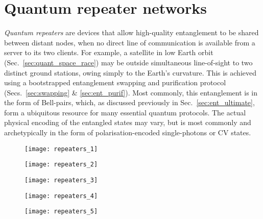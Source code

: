 %
%

\section{Quantum repeater networks} \label{sec:rep_net} 

\textit{Quantum repeaters} are devices that allow high-quality entanglement to be shared between distant nodes, when no direct line of communication is available from a server to its two clients. For example, a satellite in low Earth orbit (Sec.~\ref{sec:quant_space_race}) may be outside simultaneous line-of-sight to two distinct ground stations, owing simply to the Earth's curvature. This is achieved using a bootstrapped entanglement swapping and purification protocol (Secs.~\ref{sec:swapping} \& \ref{sec:ent_purif}). Most commonly, this entanglement is in the form of Bell-pairs, which, as discussed previously in Sec.~\ref{sec:ent_ultimate}, form a ubiquitous resource for many essential quantum protocols. The actual physical encoding of the entangled states may vary, but is most commonly and archetypically in the form of polarisation-encoded single-photons or CV states.




\begin{figure}[!htb]
\texttt{[image: repeaters\_1]}
\caption{} \label{fig:repeaters_1}	
\end{figure}

\begin{figure}[!htb]
\texttt{[image: repeaters\_2]}
\caption{} \label{fig:repeaters_2}	
\end{figure}

\begin{figure}[!htb]
\texttt{[image: repeaters\_3]}
\caption{} \label{fig:repeaters_3}	
\end{figure}

\begin{figure}[!htb]
\texttt{[image: repeaters\_4]}
\caption{} \label{fig:repeaters_4}	
\end{figure}

\begin{figure}[!htb]
\texttt{[image: repeaters\_5]}
\caption{} \label{fig:repeaters_5}
\end{figure}